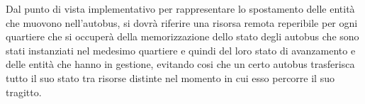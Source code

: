 Dal punto di vista implementativo per rappresentare lo spostamento delle entità che muovono nell'autobus, si dovrà riferire una risorsa remota reperibile per ogni quartiere che si occuperà della memorizzazione dello stato degli autobus che sono stati instanziati nel medesimo quartiere e quindi del loro stato di avanzamento e delle entità che hanno in gestione, evitando cosi che un certo autobus trasferisca tutto il suo stato tra risorse distinte nel momento in cui esso percorre il suo tragitto.